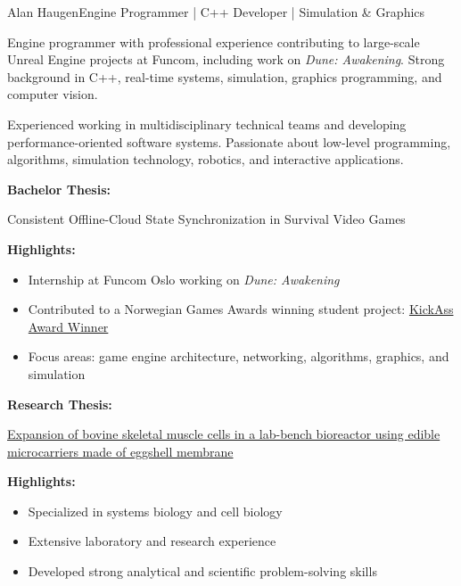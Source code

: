 \documentclass{article}
\begin{document}
\begin{cv}[avatar]{Alan Haugen}{Engine Programmer | C++ Developer | Simulation \& Graphics}


Engine programmer with professional experience contributing to large-scale Unreal Engine projects at Funcom, including work on \emph{Dune: Awakening}. Strong background in C++, real-time systems, simulation, graphics programming, and computer vision.

Experienced working in multidisciplinary technical teams and developing performance-oriented software systems. Passionate about low-level programming, algorithms, simulation technology, robotics, and interactive applications.


\begin{cvevent}[2023][2026]

    \textbf{Bachelor Thesis:}
    
    Consistent Offline-Cloud State Synchronization in Survival Video Games

    \textbf{Highlights:}
    \begin{itemize}
        \item Internship at Funcom Oslo working on \emph{Dune: Awakening}
        \item Contributed to a Norwegian Games Awards winning student project:
        \href{https://www.inn.no/studier/studenthistorier/film-tv-og-spill/vant-pris-i-trondheim/index.html}{KickAss Award Winner}
        \item Focus areas: game engine architecture, networking, algorithms, graphics, and simulation
    \end{itemize}
\end{cvevent}

\begin{cvevent}[2020][2022]

    \textbf{Research Thesis:}
    
    \href{https://ntnuopen.ntnu.no/ntnu-xmlui/handle/11250/3037560}
    {Expansion of bovine skeletal muscle cells in a lab-bench bioreactor using edible microcarriers made of eggshell membrane}

    \textbf{Highlights:}
    \begin{itemize}
        \item Specialized in systems biology and cell biology
        \item Extensive laboratory and research experience
        \item Developed strong analytical and scientific problem-solving skills
    \end{itemize}
\end{cvevent}


\end{cv}
\end{document}
